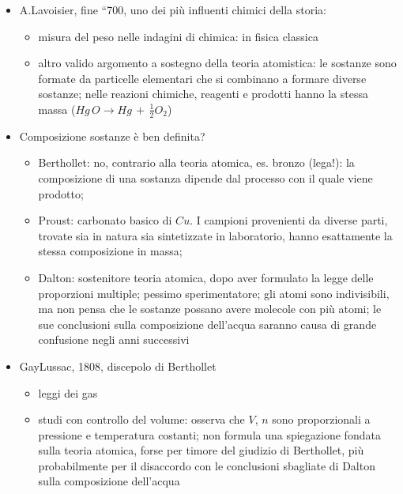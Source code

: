\documentclass[letterpaper,10pt,italian]{jupyterBook}
\begin{document}
\begin{itemize}
\item {} 
\sphinxAtStartPar
A.Lavoisier, fine “700, uno dei più influenti chimici della storia:
\begin{itemize}
\item {} 
\sphinxAtStartPar
misura del peso nelle indagini di chimica:  in fisica classica

\item {} 
\sphinxAtStartPar
altro valido argomento a sostegno della teoria atomistica: le sostanze sono formate da particelle elementari che si combinano a formare diverse sostanze; nelle reazioni chimiche, reagenti e prodotti hanno la stessa massa (\(Hg \, O \rightarrow Hg \, + \, \frac{1}{2} O_2\))

\end{itemize}

\item {} 
\sphinxAtStartPar
Composizione sostanze è ben definita?
\begin{itemize}
\item {} 
\sphinxAtStartPar
Berthollet: no, contrario alla teoria atomica, es. bronzo (lega!): la composizione di una sostanza dipende dal processo con il quale viene prodotto;

\item {} 
\sphinxAtStartPar
Proust: carbonato basico di \(Cu\). I campioni provenienti da diverse parti, trovate sia in natura sia sintetizzate in laboratorio, hanno esattamente la stessa composizione in massa;

\item {} 
\sphinxAtStartPar
Dalton: sostenitore teoria atomica, dopo aver formulato la legge delle proporzioni multiple; pessimo sperimentatore; gli atomi sono indivisibili, ma non pensa che le sostanze possano avere molecole con più atomi; le sue conclusioni sulla composizione dell’acqua saranno causa di grande confusione negli anni successivi

\end{itemize}

\item {} 
\sphinxAtStartPar
Gay\sphinxhyphen{}Lussac, 1808, discepolo di Berthollet
\begin{itemize}
\item {} 
\sphinxAtStartPar
leggi dei gas

\item {} 
\sphinxAtStartPar
studi con controllo del volume: osserva che \(V\), \(n\) sono proporzionali a pressione e temperatura costanti; non formula una spiegazione fondata sulla teoria atomica, forse per timore del giudizio di Berthollet, più probabilmente per il disaccordo con le conclusioni sbagliate di Dalton sulla composizione dell’acqua


\end{itemize}
\end{itemize}
\end{document}
